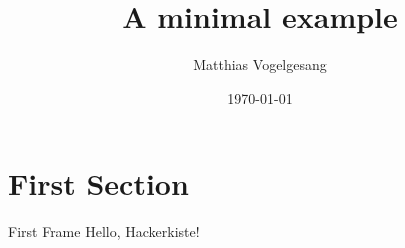 \documentclass{beamer}
\title{A minimal example}
\date{\today}
\author{Matthias Vogelgesang}
\institute{Centre for Modern Beamer Themes}
\begin{document}
  \maketitle
  \section{First Section}
  \begin{frame}{First Frame}
    Hello, Hackerkiste!
  \end{frame}
\end{document}
